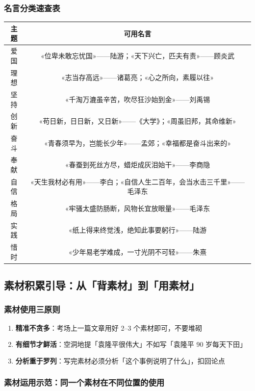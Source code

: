 \subsubsection{名言分类速查表}

\begin{center}
\begin{tabular}{c|c}
\textbf{主题} & \textbf{可用名言} \\ \hline
爱国 & «位卑未敢忘忧国»——陆游；«天下兴亡，匹夫有责»——顾炎武 \\
理想 & «志当存高远»——诸葛亮；«心之所向，素履以往» \\
坚持 & «千淘万漉虽辛苦，吹尽狂沙始到金»——刘禹锡 \\
创新 & «苟日新，日日新，又日新»——《大学》；«周虽旧邦，其命维新» \\
奋斗 & «青春须早为，岂能长少年»——孟郊；«幸福都是奋斗出来的» \\
奉献 & «春蚕到死丝方尽，蜡炬成灰泪始干»——李商隐 \\
自信 & «天生我材必有用»——李白；«自信人生二百年，会当水击三千里»——毛泽东 \\
格局 & «牢骚太盛防肠断，风物长宜放眼量»——毛泽东 \\
实践 & «纸上得来终觉浅，绝知此事要躬行»——陆游 \\
惜时 & «少年易老学难成，一寸光阴不可轻»——朱熹 \\
\end{tabular}
\end{center}

\subsection{素材积累引导：从「背素材」到「用素材」}

\subsubsection{素材使用三原则}

\begin{enumerate}
  \item \textbf{精准不贪多}：考场上一篇文章用好 2--3 个素材即可，不要堆砌
  \item \textbf{有细节才鲜活}：空洞地提「袁隆平很伟大」不如写「袁隆平 90 岁每天下田」
  \item \textbf{分析重于罗列}：写完素材必须分析「这个事例说明了什么」，扣回论点
\end{enumerate}

\subsubsection{素材运用示范：同一个素材在不同位置的使用}

